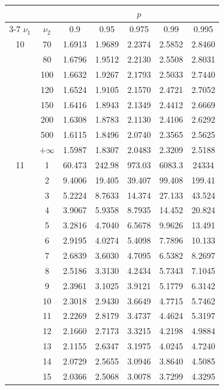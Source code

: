 \newpage
\noindent
\begin{minipage}{0.49\textwidth}
	\begin{center}
		\begin{tabular}{ccccccc}
			& & \multicolumn{5}{c}{$p$}\\
			\cline{3-7}
			$\nu_1$ & $\nu_2$ & 0.9 & 0.95 & 0.975 & 0.99 & 0.995 \\
			\midrule
			10 & 70 & 1.6913 & 1.9689 & 2.2374 & 2.5852 & 2.8460 \\
			& 80 & 1.6796 & 1.9512 & 2.2130 & 2.5508 & 2.8031 \\
			& 100 & 1.6632 & 1.9267 & 2.1793 & 2.5033 & 2.7440 \\
			& 120 & 1.6524 & 1.9105 & 2.1570 & 2.4721 & 2.7052 \\
			& 150 & 1.6416 & 1.8943 & 2.1349 & 2.4412 & 2.6669 \\
			& 200 & 1.6308 & 1.8783 & 2.1130 & 2.4106 & 2.6292 \\
			& 500 & 1.6115 & 1.8496 & 2.0740 & 2.3565 & 2.5625 \\
			& $+\infty$ & 1.5987 & 1.8307 & 2.0483 & 2.3209 & 2.5188 \\
			\midrule
			11 & 1 & 60.473 & 242.98 & 973.03 & 6083.3 & 24334 \\
			& 2 & 9.4006 & 19.405 & 39.407 & 99.408 & 199.41 \\
			& 3 & 5.2224 & 8.7633 & 14.374 & 27.133 & 43.524 \\
			& 4 & 3.9067 & 5.9358 & 8.7935 & 14.452 & 20.824 \\
			& 5 & 3.2816 & 4.7040 & 6.5678 & 9.9626 & 13.491 \\
			& 6 & 2.9195 & 4.0274 & 5.4098 & 7.7896 & 10.133 \\
			& 7 & 2.6839 & 3.6030 & 4.7095 & 6.5382 & 8.2697 \\
			& 8 & 2.5186 & 3.3130 & 4.2434 & 5.7343 & 7.1045 \\
			& 9 & 2.3961 & 3.1025 & 3.9121 & 5.1779 & 6.3142 \\[5pt]
			& 10 & 2.3018 & 2.9430 & 3.6649 & 4.7715 & 5.7462 \\
			& 11 & 2.2269 & 2.8179 & 3.4737 & 4.4624 & 5.3197 \\
			& 12 & 2.1660 & 2.7173 & 3.3215 & 4.2198 & 4.9884 \\
			& 13 & 2.1155 & 2.6347 & 3.1975 & 4.0245 & 4.7240 \\
			& 14 & 2.0729 & 2.5655 & 3.0946 & 3.8640 & 4.5085 \\
			& 15 & 2.0366 & 2.5068 & 3.0078 & 3.7299 & 4.3295 \\

\end{tabular}
\end{center}
\end{minipage}
